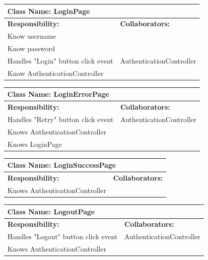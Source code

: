 \documentclass[]{article}
\begin{document}
	\begin{table}[H]
	\centering
	\begin{tabular}{|p{6cm}|p{6cm}|}
	\hline 
		\multicolumn{2}{|l|}{\textbf{Class Name: LoginPage}} \\
	\hline
	\textbf{Responsibility:} & \textbf{Collaborators:} \\
	\hline
	Know username & \\ \hline
	Know password & \\ \hline
	Handles "Login" button click event  & AuthenticationController\\ \hline
	Know AuthenticationController &\\ \hline
	\end{tabular}
	\end{table}

	\begin{table}[H]
	\centering
	\begin{tabular}{|p{6cm}|p{6cm}|}
	\hline 
		\multicolumn{2}{|l|}{\textbf{Class Name: LoginErrorPage}} \\
	\hline
	\textbf{Responsibility:} & \textbf{Collaborators:} \\
	\hline
	Handles "Retry" button click event  & AuthenticationController\\ \hline 
	Knows AuthenticationController &\\ \hline
	Knows LoginPage &\\ \hline
	\end{tabular}
	\end{table}

	
	\begin{table}[H]
	\centering
	\begin{tabular}{|p{6cm}|p{6cm}|}
	\hline 
		\multicolumn{2}{|l|}{\textbf{Class Name: LoginSuccessPage}} \\
	\hline
	\textbf{Responsibility:} & \textbf{Collaborators:} \\
	\hline
	Knows AuthenticationController &\\ \hline
	\end{tabular}
	\end{table}
	

	\begin{table}[H]
	\centering
	\begin{tabular}{|p{6cm}|p{6cm}|}
	\hline 
		\multicolumn{2}{|l|}{\textbf{Class Name: LogoutPage}} \\
	\hline
	\textbf{Responsibility:} & \textbf{Collaborators:} \\
	\hline 
	Handles "Logout" button click event  & AuthenticationController\\ \hline
	Knows AuthenticationController & \\ \hline
	\end{tabular}
	\end{table}
\end{document}
